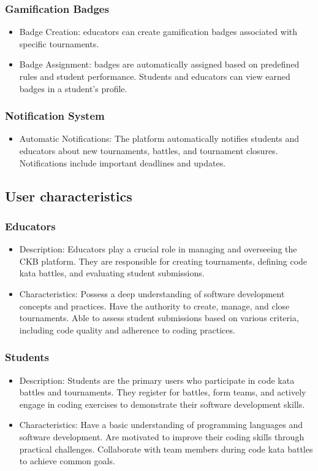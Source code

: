 \subsubsection{Gamification Badges}
\begin{itemize}
    \item Badge Creation: educators can create gamification badges associated with specific tournaments.
    \item  Badge Assignment: badges are automatically assigned based on predefined rules and student performance. Students and educators can view earned badges in a student's profile.
\end{itemize}

\subsubsection{Notification System}
\begin{itemize}
    \item Automatic Notifications: The platform automatically notifies students and educators about new tournaments, battles, and tournament closures. Notifications include important deadlines and updates.
\end{itemize}

\subsection{User characteristics}

\subsubsection{Educators}
\begin{itemize}
    \item Description: Educators play a crucial role in managing and overseeing the CKB platform. They are responsible for creating tournaments, defining code kata battles, and evaluating student submissions.
    \item Characteristics: Possess a deep understanding of software development concepts and practices. Have the authority to create, manage, and close tournaments. Able to assess student submissions based on various criteria, including code quality and adherence to coding practices.
\end{itemize}

\subsubsection{Students}
\begin{itemize}
    \item Description: Students are the primary users who participate in code kata battles and tournaments. They register for battles, form teams, and actively engage in coding exercises to demonstrate their software development skills.
    \item Characteristics: Have a basic understanding of programming languages and software development. Are motivated to improve their coding skills through practical challenges. Collaborate with team members during code kata battles to achieve common goals.
\end{itemize}


